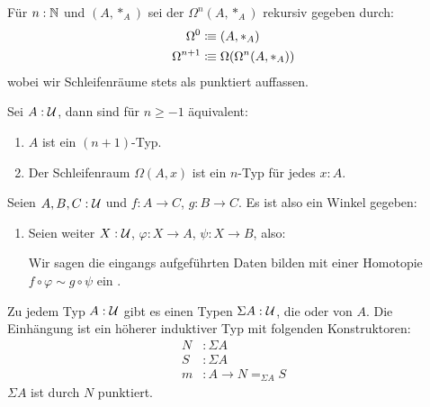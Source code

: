 \begin{definition}
  Für $n:\mathbb{N}$ und $(A,\ast_A)$ sei der  $\Omega^n(A,\ast_A)$ rekursiv gegeben durch:
  \begin{align*}
    \Omega^0&\vcentcolon\mspace{-1.2mu}\equiv (A,\ast_A) \\
    \Omega^{n+1}&\vcentcolon\mspace{-1.2mu}\equiv \Omega(\Omega^n(A,\ast_A))
  \end{align*}
  wobei wir Schleifenräume stets als punktiert auffassen.
\end{definition}

\begin{lemma}
  Sei $A:\mathcal{U}$, dann sind für $n\geq -1$ äquivalent:
  \begin{enumerate}[label=\roman*)]
  \item $A$ ist ein $(n+1)$-Typ.
  \item Der Schleifenraum $\Omega(A,x)$ ist ein $n$-Typ für jedes $x:A$.
  \end{enumerate}
\end{lemma}

\begin{definition}
  Seien $A,B,C:\mathcal{U}$ und $f:A\to C$, $g:B\to C$. Es ist also ein Winkel gegeben:
  \begin{center}
  \end{center}
  \begin{enumerate}
  \item Seien weiter $X:\mathcal{U}$, $\varphi:X\to A$, $\psi:X\to B$, also:
    \begin{center}
  \end{center}
  Wir sagen die eingangs aufgeführten Daten bilden mit einer Homotopie $f\circ \varphi \sim g\circ \psi$ ein .
  \end{enumerate}
\end{definition}

\begin{regeln}[Suspension]
  Zu jedem Typ $A:\mathcal{U}$ gibt es einen Typen $\Sigma A:\mathcal{U}$, die  oder  von $A$.
  Die Einhängung ist ein höherer induktiver Typ mit folgenden Konstruktoren:
  \begin{align*}
    N&:\Sigma A \\
    S&:\Sigma A \\
    m&:A\to N=_{\Sigma A}S
  \end{align*}
  $\Sigma A$ ist durch $N$ punktiert.
\end{regeln}

